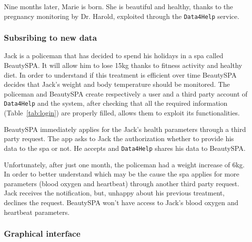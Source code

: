       Nine months later, Marie is born. She is beautiful and healthy, thanks to the pregnancy monitoring by Dr. Harold, exploited through the \texttt{Data4Help} service.


    \subsubsection{Subsribing to new data}

      Jack is a policeman that has decided to spend his holidays in a spa called BeautySPA. It will allow him to lose 15kg thanks to fitness activity and healthy diet. In order to understand if this treatment is efficient over time BeautySPA decides that Jack's weight and body temperature should be monitored. The policeman and BeautySPA create respectively a user and a third party account of \texttt{Data4Help} and the system, after checking that all the required information (Table~\ref{tab:login}) are properly filled, allows them to exploit its functionalities.

      BeautySPA immediately applies for the Jack's health parameters through a third party request. The app asks to Jack the authorization whether to provide his data to the spa or not. He accepts and \texttt{Data4Help} shares his data to BeautySPA.

      Unfortunately, after just one month, the policeman had a weight increase of 6kg. In order to better understand which may be the cause the spa applies for more parameters (blood oxygen and heartbeat) through another third party request. Jack receives the notification, but, unhappy about his previous treatment, declines the request. BeautySPA won't have access to Jack's blood oxygen and heartbeat parameters.

    \subsubsection{Graphical interface}

